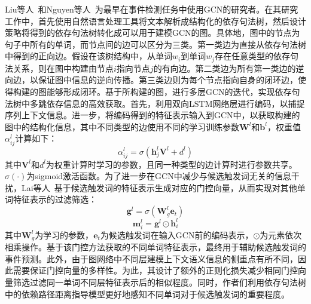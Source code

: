 Liu等人~\cite{liu2018jointly}和Nguyen等人~\cite{nguyen2018graph}为最早在事件检测任务中使用GCN的研究者。在其研究工作中，首先使用自然语言处理工具将文本解析成结构化的依存句法树，然后设计策略将得到的依存句法树转化成可以用于建模GCN的图。具体地，图中的节点为句子中所有的单词，而节点间的边可以区分为三类。第一类边为直接从依存句法树中得到的正向边。假设在该树结构中，从单词$w_{i}$到单词$w_{j}$存在任意类型的依存句法关系，则在图中构建由节点$i$指向节点$j$的有向边。第二类边为所有第一类边的逆向边，以保证图中信息的逆向传播。第三类边则为每个节点指向自身的闭环边，使得构建的图能够形成闭环。基于所构建的图，进行多层GCN的迭代，实现依存句法树中多跳依存信息的高效获取。首先，利用双向LSTM网络层进行编码，以捕捉序列上下文信息。进一步，将编码得到的特征表示输入到GCN中，以获取构建的图中的结构化信息，其中不同类型的边使用不同的学习训练参数$\boldsymbol{W}^l$和$\boldsymbol{b}^l$，权重值$\alpha_{i j}^l$计算如下：
\begin{equation}
    \alpha_{i j}^l=\sigma(\boldsymbol{h}_j^l \boldsymbol{V}^l+d^l)
\end{equation}
其中$\boldsymbol{V}^l$和$d^l$为权重计算时学习的参数，且同一种类型的边计算时进行参数共享。$\sigma(\cdot)$为sigmoid激活函数。为了进一步在GCN中减少与候选触发词无关的信息干扰，Lai等人~\cite{lai2020event}基于候选触发词的特征表示生成对应的门控向量，从而实现对其他单词特征表示的过滤筛选：
\begin{equation}
    \boldsymbol{g}^l=\sigma\left(\boldsymbol{W}_g^l \boldsymbol{e}_t\right)
\end{equation}
\begin{equation}
    \boldsymbol{m}_i^l=\boldsymbol{g}^l \odot \boldsymbol{h}_i^l
\end{equation}
其中$\boldsymbol{W}_g^l$为学习的参数，$\boldsymbol{e}_t$为候选触发词在输入GCN前的编码表示，$\odot$为元素依次相乘操作。基于该门控方法获取的不同单词特征表示，最终用于辅助候选触发词的事件预测。此外，由于图网络中不同层建模上下文语义信息的侧重点有所不同，因此需要保证门控向量的多样性。为此，其设计了额外的正则化损失减少相同门控向量筛选过滤同一单词不同层特征表示后的相似程度。同时，作者们利用依存句法树中的依赖路径距离指导模型更好地感知不同单词对于候选触发词的重要程度。

